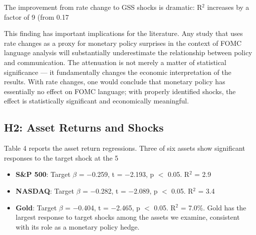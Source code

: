 \documentclass[12pt]{article}
\begin{document}
The improvement from rate change to GSS shocks is dramatic: R$^2$ increases by a factor of 9 (from 0.17%

This finding has important implications for the literature. Any study that uses rate changes as a proxy for monetary policy surprises in the context of FOMC language analysis will substantially underestimate the relationship between policy and communication. The attenuation is not merely a matter of statistical significance --- it fundamentally changes the economic interpretation of the results. With rate changes, one would conclude that monetary policy has essentially no effect on FOMC language; with properly identified shocks, the effect is statistically significant and economically meaningful.

\subsection{H2: Asset Returns and Shocks}

Table 4 reports the asset return regressions. Three of six assets show significant responses to the target shock at the 5%

\begin{itemize}
\item \textbf{S\&P 500}: Target $\beta$ = $-$0.259, t = $-$2.193, p $<$ 0.05. R$^2$ = 2.9%
\end{itemize}

\begin{itemize}
\item \textbf{NASDAQ}: Target $\beta$ = $-$0.282, t = $-$2.089, p $<$ 0.05. R$^2$ = 3.4%
\end{itemize}

\begin{itemize}
\item \textbf{Gold}: Target $\beta$ = $-$0.404, t = $-$2.465, p $<$ 0.05. R$^2$ = 7.0\%. Gold has the largest response to target shocks among the assets we examine, consistent with its role as a monetary policy hedge.
\end{itemize}
\end{document}
